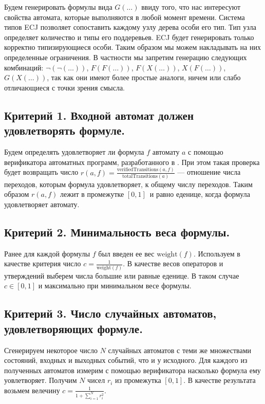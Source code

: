 \documentclass[12pt,fleqn]{article}
\begin{document}
Будем генерировать формулы вида $G(\ldots)$ ввиду того, что нас интересуют свойства автомата, которые выполняются
в любой момент времени. Система типов ECJ позволяет сопоставить каждому узлу дерева особи его тип. Тип узла
определяет количество и типы его поддеревьев. ECJ будет генерировать только корректно типизирующиеся особи.
Таким образом мы можем накладывать на них определенные ограничения. В частности мы запретим генерацию следующих
комбинаций: $\lnot(\lnot(\ldots))$, $F(F(\ldots))$, $F(X(\ldots))$, $X(F(\ldots))$, $G(X(\ldots))$, так как
они имеют более простые аналоги, ничем или слабо отличающиеся с точки зрения смысла.

\subsection{Критерий 1. Входной автомат должен удовлетворять формуле.}

Будем определять удовлетворяет ли формула $f$ автомату $a$ с помощью верификатора автоматных программ, разработанного в \cite{eg}.
При этом такая проверка будет возвращать число $r(a, f) = \frac{\text{verifiedTransitions}(a, f)}{\text{totalTransitions}(a)}$ --- отношение числа
переходов, которым формула удовлетворяет, к общему числу переходов. Таким образом $r(a, f)$ лежит в промежутке $[0, 1]$\ и равно
еденице, когда формула удовлетворяет автомату.

\subsection{Критерий 2. Минимальность веса формулы.}

Ранее для каждой формулы $f$ был введен ее вес $\text{weight}(f)$. Используем в качестве критерия число $c = \frac{1}{\text{weight}(f)}$.
В качестве весов операторов и утверждений выберем числа большие или равные еденице.
В таком случае $c \in [0, 1]$ и максимально при минимальном весе формулы.

\subsection{Критерий 3. Число случайных автоматов, удовлетворяющих формуле.}

Сгенерируем некоторое число $N$ случайных автоматов с теми же множествами состояний, входных и выходных событий, что и
у исходного. Для каждого из полученных автоматов измерим с помощью верификатора насколько формула ему уовлетворяет.
Получим $N$ чисел $r_i$ из промежутка $[0, 1]$. В качестве результата возьмем велечину $c = \frac{1}{1 + \sum_{i = 1}^{N}r_i^2}$.
\end{document}
